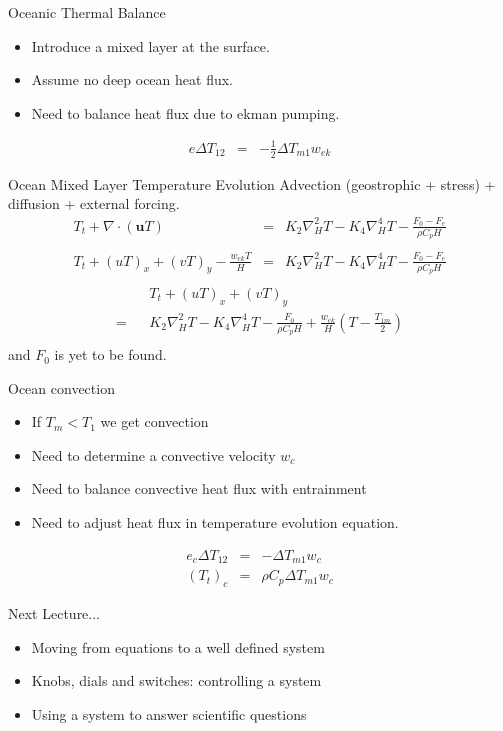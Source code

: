 \documentclass[a4paper]{beamer}
\begin{document}
\begin{frame}{Oceanic Thermal Balance}
\begin{itemize}
\item Introduce a mixed layer at the surface.
\item Assume no deep ocean heat flux.
\item Need to balance heat flux due to ekman pumping.
\end{itemize}
\begin{eqnarray}
e\Delta T_{12} & = & -\frac{1}{2}\Delta T_{m1}w_{ek}
\end{eqnarray}
\end{frame}

\begin{frame}{Ocean Mixed Layer Temperature Evolution}
Advection (geostrophic + stress) + diffusion +  external forcing.
\begin{eqnarray}
T_t + \nabla\cdot(\mathbf{u}T)            & = & K_2\nabla^2_HT - K_4\nabla^4_HT - \frac{F_0 - F_e}{\rho C_pH}\nonumber\\
&&\\
T_t + (uT)_x + (vT)_y - \frac{w_{ek}T}{H} & = & K_2\nabla^2_HT - K_4\nabla^4_HT - \frac{F_0 - F_e}{\rho C_pH}\nonumber\\
&&
\end{eqnarray}
\begin{eqnarray}
  &&T_t + (uT)_x + (vT)_y  \nonumber\\
= & & K_2\nabla^2_HT - K_4\nabla^4_HT - \frac{F_0}{\rho C_pH} + \frac{w_{ek}}{H}\left(T - \frac{T_{1m}}{2}\right)\nonumber\\
\end{eqnarray}
and $F_0$ is yet to be found.
\end{frame}

\begin{frame}{Ocean convection}
\begin{itemize}
\item If $T_m < T_1$ we get convection
\item Need to determine a convective velocity $w_{c}$
\item Need to balance convective heat flux with entrainment
\item Need to adjust heat flux in temperature evolution equation.
\end{itemize}
\begin{eqnarray}
e_{c}\Delta T_{12} & = & -\Delta T_{m1}w_{c}\\
(T_t)_c & = & \rho C_p\Delta T_{m1}w_{c}
\end{eqnarray}
\end{frame}

\begin{frame}{Next Lecture...}
\begin{itemize}
\item Moving from equations to a well defined system
\item Knobs, dials and switches: controlling a system
\item Using a system to answer scientific questions
\end{itemize}
\end{frame}
\end{document}
